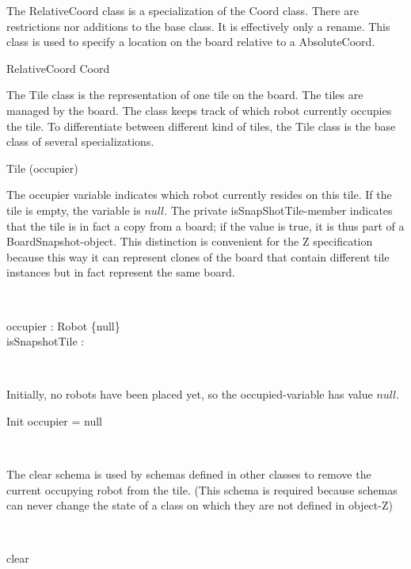 \documentclass[12pt]{article}
\begin{document}
The RelativeCoord class is a specialization of the Coord class. There are restrictions nor additions to the base class. It is effectively only a rename. This class is used to specify a location on the board relative to a AbsoluteCoord.
\begin{class}{RelativeCoord}
Coord \\
\end{class}

The Tile class is the representation of one tile on the board. The tiles are managed by the board. The class keeps track of which robot currently occupies the tile. To differentiate between different kind of tiles, the Tile class is the base class of several specializations.

\begin{class}{Tile}
\upharpoonright (occupier) \\
\begin{zpar}
The occupier variable indicates which robot currently resides on this tile. If the tile is empty, the variable is $null$. The private isSnapShotTile-member indicates that the tile is in fact a copy from a board; if the value is true, it is thus part of a BoardSnapshot-object. This distinction is convenient for the Z specification because this way it can represent clones of the board that contain different tile instances but in fact represent the same board.
\end{zpar} \\
\begin{state}
occupier : Robot \cup \{null\} \\
isSnapshotTile : \bool \\
\end{state} \\
\begin{zpar}
Initially, no robots have been placed yet, so the occupied-variable has value $null$.
\end{zpar}
\begin{schema}{Init}
occupier = null
\end{schema} \\
\begin{zpar}
The clear schema is used by schemas defined in other classes to remove the current occupying robot from the tile. (This schema is required because schemas can never change the state of a class on which they are not defined in object-Z)
\end{zpar} \\
\begin{schema}{clear}

\end{schema}
\end{class}
\end{document}
